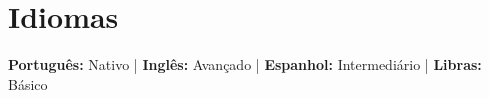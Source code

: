 \documentclass[11pt]{article}
\begin{document}
\section{Idiomas}
 \begin{itemize}[leftmargin=0.15in, label={}]
    \small{\item{
     \textbf{Português:} Nativo \quad | \quad
     \textbf{Inglês:} Avançado \quad | \quad
     \textbf{Espanhol:} Intermediário \quad | \quad
     \textbf{Libras:} Básico
    }}
 \end{itemize}
\end{document}
